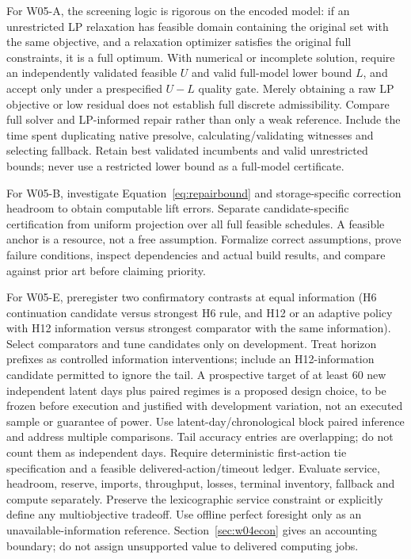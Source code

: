 \documentclass[11pt,letterpaper]{article}
\begin{document}
For W05-A, the screening logic is rigorous on the encoded model: if an unrestricted LP relaxation has feasible domain containing the original set with the same objective, and a relaxation optimizer satisfies the original full constraints, it is a full optimum. With numerical or incomplete solution, require an independently validated feasible $U$ and valid full-model lower bound $L$, and accept only under a prespecified $U-L$ quality gate. Merely obtaining a raw LP objective or low residual does not establish full discrete admissibility. Compare full solver and LP-informed repair rather than only a weak reference. Include the time spent duplicating native presolve, calculating/validating witnesses and selecting fallback. Retain best validated incumbents and valid unrestricted bounds; never use a restricted lower bound as a full-model certificate.

For W05-B, investigate Equation~\ref{eq:repairbound} and storage-specific correction headroom to obtain computable lift errors. Separate candidate-specific certification from uniform projection over all full feasible schedules. A feasible anchor is a resource, not a free assumption. Formalize correct assumptions, prove failure conditions, inspect dependencies and actual build results, and compare against prior art before claiming priority.

For W05-E, preregister two confirmatory contrasts at equal information (H6 continuation candidate versus strongest H6 rule, and H12 or an adaptive policy with H12 information versus strongest comparator with the same information). Select comparators and tune candidates only on development. Treat horizon prefixes as controlled information interventions; include an H12-information candidate permitted to ignore the tail. A prospective target of at least 60 new independent latent days plus paired regimes is a proposed design choice, to be frozen before execution and justified with development variation, not an executed sample or guarantee of power. Use latent-day/chronological block paired inference and address multiple comparisons. Tail accuracy entries are overlapping; do not count them as independent days. Require deterministic first-action tie specification and a feasible delivered-action/timeout ledger. Evaluate service, headroom, reserve, imports, throughput, losses, terminal inventory, fallback and compute separately. Preserve the lexicographic service constraint or explicitly define any multiobjective tradeoff. Use offline perfect foresight only as an unavailable-information reference. Section~\ref{sec:w04econ} gives an accounting boundary; do not assign unsupported value to delivered computing jobs.
\end{document}
